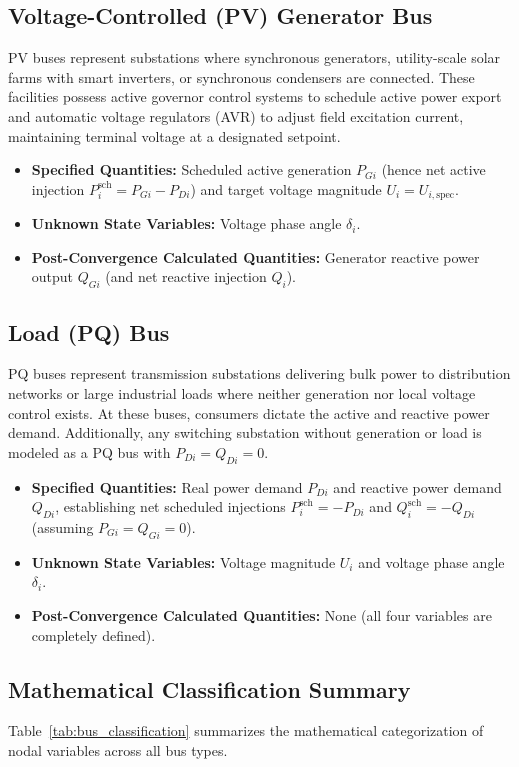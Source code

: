 \documentclass[12pt,a4paper,oneside]{report}
\begin{document}
\subsection{Voltage-Controlled (PV) Generator Bus}
PV buses represent substations where synchronous generators, utility-scale solar farms with smart inverters, or synchronous condensers are connected. These facilities possess active governor control systems to schedule active power export and automatic voltage regulators (AVR) to adjust field excitation current, maintaining terminal voltage at a designated setpoint.
\begin{itemize}
    \item \textbf{Specified Quantities:} Scheduled active generation $P_{Gi}$ (hence net active injection $P_i^{\text{sch}} = P_{Gi} - P_{Di}$) and target voltage magnitude $U_i = U_{i,\text{spec}}$.
    \item \textbf{Unknown State Variables:} Voltage phase angle $\delta_i$.
    \item \textbf{Post-Convergence Calculated Quantities:} Generator reactive power output $Q_{Gi}$ (and net reactive injection $Q_i$).
\end{itemize}

\subsection{Load (PQ) Bus}
PQ buses represent transmission substations delivering bulk power to distribution networks or large industrial loads where neither generation nor local voltage control exists. At these buses, consumers dictate the active and reactive power demand. Additionally, any switching substation without generation or load is modeled as a PQ bus with $P_{Di} = Q_{Di} = 0$.
\begin{itemize}
    \item \textbf{Specified Quantities:} Real power demand $P_{Di}$ and reactive power demand $Q_{Di}$, establishing net scheduled injections $P_i^{\text{sch}} = -P_{Di}$ and $Q_i^{\text{sch}} = -Q_{Di}$ (assuming $P_{Gi} = Q_{Gi} = 0$).
    \item \textbf{Unknown State Variables:} Voltage magnitude $U_i$ and voltage phase angle $\delta_i$.
    \item \textbf{Post-Convergence Calculated Quantities:} None (all four variables are completely defined).
\end{itemize}

\subsection{Mathematical Classification Summary}
Table~\ref{tab:bus_classification} summarizes the mathematical categorization of nodal variables across all bus types.
\end{document}
